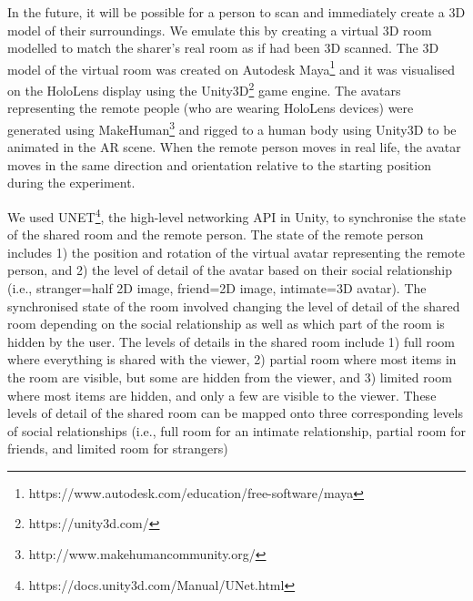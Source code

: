 
In the future, it will be possible for a person to scan and immediately create a 3D model of their surroundings. We emulate this by creating a virtual 3D room modelled to match the sharer's real room as if had been 3D scanned.  The 3D model of the virtual room was created on Autodesk Maya\footnote{https://www.autodesk.com/education/free-software/maya} and it was visualised on the HoloLens display using the Unity3D\footnote{https://unity3d.com/} game engine. The avatars representing the remote people (who are wearing HoloLens devices) were generated using MakeHuman\footnote{http://www.makehumancommunity.org/} and rigged to a human body using Unity3D to be animated in the AR scene. When the remote person moves in real life, the avatar moves in the same direction and orientation relative to the starting position during the experiment. 


We used UNET\footnote{https://docs.unity3d.com/Manual/UNet.html}, the high-level networking API in Unity, to synchronise the state of the shared room and the remote person. The state of the remote person includes 1) the position and rotation of the virtual avatar representing the remote person, and 2) the level of detail of the avatar based on their social relationship (i.e., stranger=half 2D image, friend=2D image, intimate=3D avatar). The synchronised state of the room involved changing the level of detail of the shared room depending on the social relationship as well as which part of the room is hidden by the user. The levels of details in the shared room include 1) full room where everything is shared with the viewer, 2) partial room where most items in the room are visible, but some are hidden from the viewer, and 3) limited room where most items are hidden, and only a few are visible to the viewer. These levels of detail of the shared room can be mapped onto three corresponding levels of social relationships (i.e., full room for an intimate relationship, partial room for friends, and limited room for strangers)

